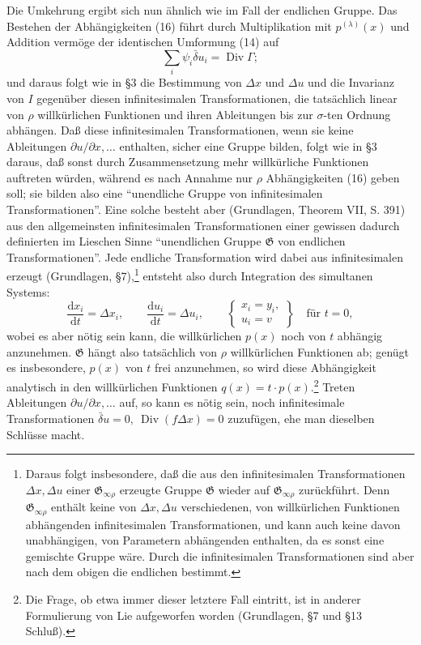 \documentclass[11pt]{article}
\newcommand{\D}{\Delta}
\providecommand{\dd}{\mathrm d}
\providecommand{\Div}{\operatorname{Div}}
\providecommand{\G}{\mathfrak G}
\providecommand{\bd}{\bar{\delta}}
\providecommand{\p}{\partial}
\providecommand{\p}{\partial}
\providecommand{\dd}{\mathrm d}
\begin{document}
Die Umkehrung ergibt sich nun ähnlich wie im Fall der endlichen Gruppe. Das Bestehen der Abhängigkeiten (16) führt durch Multiplikation mit \(p^{(\lambda)}(x)\) und Addition vermöge der identischen Umformung (14) auf
\[
\sum_i\psi_i\bd u_i=\Div\Gamma;
\]
und daraus folgt wie in \S{}3 die Bestimmung von \(\D x\) und \(\D u\) und die Invarianz von \(I\) gegenüber diesen infinitesimalen Transformationen, die tatsächlich linear von \(\rho\) willkürlichen Funktionen und ihren Ableitungen bis zur \(\sigma\)-ten Ordnung abhängen. Daß diese infinitesimalen Transformationen, wenn sie keine Ableitungen \(\p u/\p x,\ldots\) enthalten, sicher eine Gruppe bilden, folgt wie in \S{}3 daraus, daß sonst durch Zusammensetzung mehr willkürliche Funktionen auftreten würden, während es nach Annahme nur \(\rho\) Abhängigkeiten (16) geben soll; sie bilden also eine ``unendliche Gruppe von infinitesimalen Transformationen''. Eine solche besteht aber (Grundlagen, Theorem VII, S. 391) aus den allgemeinsten infinitesimalen Transformationen einer gewissen dadurch definierten im Lieschen Sinne ``unendlichen Gruppe \(\G\) von endlichen Transformationen''. Jede endliche Transformation wird dabei aus infinitesimalen erzeugt (Grundlagen, \S{}7),\footnote{Daraus folgt insbesondere, daß die aus den infinitesimalen Transformationen \(\D x,\D u\) einer \(\G_{\infty\rho}\) erzeugte Gruppe \(\G\) wieder auf \(\G_{\infty\rho}\) zurückführt. Denn \(\G_{\infty\rho}\) enthält keine von \(\D x,\D u\) verschiedenen, von willkürlichen Funktionen abhängenden infinitesimalen Transformationen, und kann auch keine davon unabhängigen, von Parametern abhängenden enthalten, da es sonst eine gemischte Gruppe wäre. Durch die infinitesimalen Transformationen sind aber nach dem obigen die endlichen bestimmt.} entsteht also durch Integration des simultanen Systems:
\[
\frac{\dd x_i}{\dd t}=\D x_i,\qquad
\frac{\dd u_i}{\dd t}=\D u_i,\qquad
\left\{\begin{array}{l}
x_i=y_i,\\
u_i=v
\end{array}\right\}
\quad\text{für }t=0,
\]
wobei es aber nötig sein kann, die willkürlichen \(p(x)\) noch von \(t\) abhängig anzunehmen. \(\G\) hängt also tatsächlich von \(\rho\) willkürlichen Funktionen ab; genügt es insbesondere, \(p(x)\) von \(t\) frei anzunehmen, so wird diese Abhängigkeit analytisch in den willkürlichen Funktionen \(q(x)=t\cdot p(x)\).\footnote{Die Frage, ob etwa immer dieser letztere Fall eintritt, ist in anderer Formulierung von Lie aufgeworfen worden (Grundlagen, \S{}7 und \S{}13 Schluß).} Treten Ableitungen \(\p u/\p x,\ldots\) auf, so kann es nötig sein, noch infinitesimale Transformationen \(\bd u=0,\ \Div(f\D x)=0\) zuzufügen, ehe man dieselben Schlüsse macht.
\end{document}
